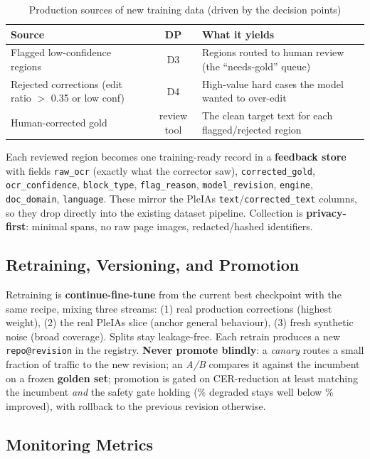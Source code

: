 \documentclass[12pt,a4paper]{article}
\begin{document}
\begin{table}[H]
\centering
\caption{Production sources of new training data (driven by the decision points)}
\small
\begin{tabularx}{\linewidth}{@{} l c L @{}}
\toprule
\textbf{Source} & \textbf{DP} & \textbf{What it yields} \\
\midrule
Flagged low-confidence regions & D3 & Regions routed to human review (the ``needs-gold'' queue) \\
Rejected corrections (edit ratio $>$ 0.35 or low conf) & D4 & High-value hard cases the model wanted to over-edit \\
Human-corrected gold & review tool & The clean target text for each flagged/rejected region \\
\bottomrule
\end{tabularx}
\end{table}

Each reviewed region becomes one training-ready record in a \textbf{feedback store} with fields \texttt{raw\_ocr} (exactly what the corrector saw), \texttt{corrected\_gold}, \texttt{ocr\_confidence}, \texttt{block\_type}, \texttt{flag\_reason}, \texttt{model\_revision}, \texttt{engine}, \texttt{doc\_domain}, \texttt{language}. These mirror the PleIAs \texttt{text}/\texttt{corrected\_text} columns, so they drop directly into the existing dataset pipeline. Collection is \textbf{privacy-first}: minimal spans, no raw page images, redacted/hashed identifiers.

\subsection{Retraining, Versioning, and Promotion}

Retraining is \textbf{continue-fine-tune} from the current best checkpoint with the same recipe, mixing three streams: (1) real production corrections (highest weight), (2) the real PleIAs slice (anchor general behaviour), (3) fresh synthetic noise (broad coverage). Splits stay leakage-free. Each retrain produces a new \texttt{repo@revision} in the registry. \textbf{Never promote blindly}: a \emph{canary} routes a small fraction of traffic to the new revision; an \emph{A/B} compares it against the incumbent on a frozen \textbf{golden set}; promotion is gated on CER-reduction at least matching the incumbent \emph{and} the safety gate holding (\% degraded stays well below \% improved), with rollback to the previous revision otherwise.

\subsection{Monitoring Metrics}
\end{document}

